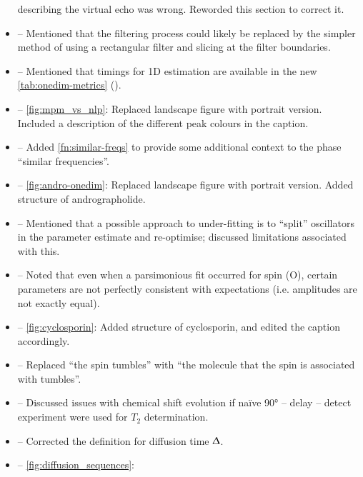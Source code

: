 \documentclass[12pt]{article}
\begin{document}
\begin{itemize}
            describing the virtual echo was wrong. Reworded this section to
            correct it.
        \item {} -- Mentioned that the filtering
            process could likely be replaced by the simpler method of using a
            rectangular filter and slicing at the filter boundaries.
        \item {} -- Mentioned that timings for 1D
            estimation are available in the new \cref{tab:onedim-metrics}
            ().
        \item {} -- \cref{fig:mpm_vs_nlp}: Replaced
            landscape figure with portrait version. Included a description of the
            different peak colours in the caption.
        \item {} -- Added \cref{fn:similar-freqs} to
            provide some additional context to the phase ``similar frequencies''.
        \item {} -- \cref{fig:andro-onedim}: Replaced
            landscape figure with portrait version. Added structure of andrographolide.
        \item {} -- Mentioned that a possible approach
            to under-fitting is to ``split'' oscillators in the parameter
            estimate and re-optimise; discussed limitations associated with
            this.
        \item {} -- Noted that even when a parsimonious fit
            occurred for spin (O), certain parameters are not perfectly consistent
            with expectations (i.e. amplitudes are not exactly equal).
        \item {} -- \cref{fig:cyclosporin}: Added structure of
            cyclosporin, and edited the caption accordingly.
        \item {} -- Replaced ``the spin tumbles''
            with ``the molecule that the spin is associated with tumbles''.
        \item {} -- Discussed issues with chemical shift
            evolution if na\"ive \ang{90} -- delay -- detect experiment were
            used for $T_2$ determination.
        \item {} -- Corrected the definition for
            diffusion time $\Updelta$.
        \item {} -- \cref{fig:diffusion_sequences}:

\end{itemize}
\end{document}
